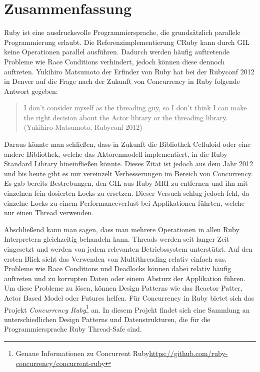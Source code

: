 \section{Zusammenfassung}
Ruby ist eine ausdrucksvolle Programmiersprache, die grundsätzlich parallele Programmierung erlaubt. Die Referenzimplementierung CRuby kann durch GIL keine Operationen parallel ausführen. Dadurch werden häufig auftretende Probleme wie Race Conditions verhindert, jedoch können diese dennoch auftreten. Yukihiro Matsumoto der Erfinder von Ruby hat bei der Rubyconf 2012 in Denver auf die Frage nach der Zukunft von Concurrency in Ruby folgende Antwort gegeben:

\begin{quote}
I don't consider myself as the threading guy, so I don't think I can make the right decision about the Actor library or the threading library.
 (Yukihiro Matsumoto, Rubyconf 2012)
\end{quote}

Daraus könnte man schließen, dass in Zukunft die Bibliothek Celluloid oder eine andere Bibliothek, welche das Aktorenmodell implementiert, in die Ruby Standard Library hineinfließen könnte. Dieses Zitat ist jedoch aus dem Jahr 2012 und bis heute gibt es nur vereinzelt Verbesserungen im Bereich von Concurrency. Es gab bereits Bestrebungen, den GIL aus Ruby MRI zu entfernen und ihn mit einzelnen fein dosierten Locks zu ersetzen. Dieser Versuch schlug jedoch fehl, da einzelne Locks zu einem Performanceverlust bei Applikationen führten, welche nur einen Thread verwenden. 

Abschließend kann man sagen, dass man mehrere Operationen in allen Ruby Interpretern gleichzeitig behandeln kann. Threads werden seit langer Zeit eingesetzt und werden von jedem relevanten Betriebssystem unterstützt. Auf den ersten Blick sieht das Verwenden von Multithreading relativ einfach aus. Probleme wie Race Conditions und Deadlocks können dabei relativ häufig auftreten und zu korrupten Daten oder einem Absturz der Applikation führen. Um diese Probleme zu lösen, können Design Patterns wie das Reactor Patter, Actor Based Model oder Futures helfen. Für Concurrency in Ruby bietet sich das Projekt \emph{Concurrency Ruby}\footnote{Genaue Informationen zu Concurrent Ruby\url{https://github.com/ruby-concurrency/concurrent-ruby}} an. In diesem Projekt findet sich eine Sammlung an unterschiedlichen Design Patterns und Datenstrukturen, die für die Programmiersprache Ruby Thread-Safe sind.

